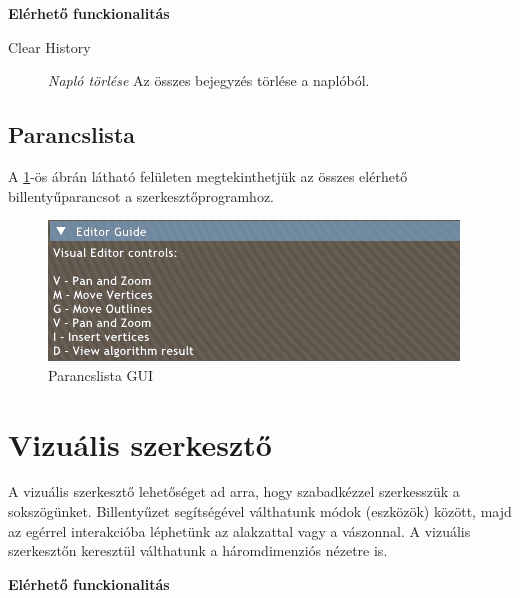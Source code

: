 \textbf{Elérhető funckionalitás}

\begin{description}
    \item[Clear History] \textit{Napló törlése} Az összes bejegyzés törlése a naplóból.
\end{description}

\subsection{Parancslista}

A \ref{fig:user_guide-1}-ös ábrán látható felületen megtekinthetjük az összes elérhető billentyűparancsot a szerkesztőprogramhoz.

\begin{figure}[H]
    \centering
    \includegraphics[width=1\linewidth]{images/user_guide.png}
    \caption{Parancslista GUI}
    \label{fig:user_guide-1}
\end{figure}


\section{Vizuális szerkesztő}\label{sec:visual_editor}

A vizuális szerkesztő lehetőséget ad arra, hogy szabadkézzel szerkesszük a sokszögünket. Billentyűzet segítségével válthatunk módok (eszközök) között, majd az egérrel interakcióba léphetünk az alakzattal vagy a vászonnal. A vizuális szerkesztőn keresztül válthatunk a háromdimenziós nézetre is.

\textbf{Elérhető funckionalitás}

